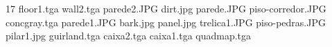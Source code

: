 17
floor1.tga
wall2.tga
parede2.JPG
dirt.jpg
parede.JPG
piso-corredor.JPG
concgray.tga
parede1.JPG
bark.jpg
panel.jpg
trelica1.JPG
piso-pedras.JPG
pilar1.jpg
guirland.tga
caixa2.tga
caixa1.tga
quadmap.tga
